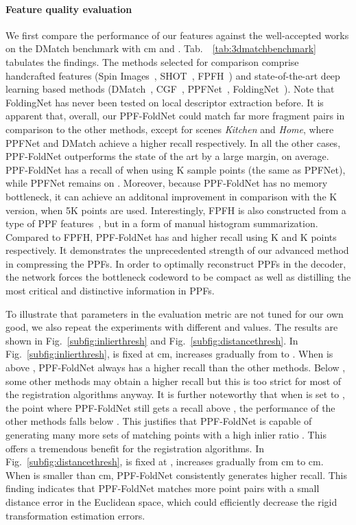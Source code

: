 \paragraph{Feature quality evaluation}
We first compare the performance of our features against the well-accepted works on the DMatch benchmark with  cm and . Tab.~~\ref{tab:3dmatchbenchmark} tabulates the findings. The methods selected for comparison comprise  handcrafted features (Spin Images~\cite{spin}, SHOT~\cite{shot}, FPFH~\cite{fpfh}) and  state-of-the-art deep learning based methods (DMatch~\cite{zeng20163dmatch}, CGF~\cite{Khoury_2017_ICCV}, PPFNet~\cite{ppfnet}, FoldingNet~\cite{foldingnet}). Note that FoldingNet has never been tested on local descriptor extraction before. It is apparent that, overall, our PPF-FoldNet could match far more fragment pairs in comparison to the other methods, except for scenes \textit{Kitchen} and \textit{Home}, where PPFNet and DMatch achieve a higher recall respectively. In all the other cases, PPF-FoldNet outperforms the state of the art by a large margin,  on average. PPF-FoldNet has a recall of  when using K sample points (the same as PPFNet), while PPFNet remains on . Moreover, because PPF-FoldNet has no memory bottleneck, it can achieve an additonal  improvement in comparison with the K version, when 5K points are used. Interestingly, FPFH is also constructed from a type of PPF features~\cite{fpfh}, but in a form of manual histogram summarization. Compared to FPFH, PPF-FoldNet has   and  higher recall using K and K points respectively. It demonstrates the unprecedented strength of our advanced method in compressing the PPFs. In order to optimally reconstruct PPFs in the decoder, the network forces the bottleneck codeword to be compact as well as distilling the most critical and distinctive information in PPFs. 

To illustrate that parameters in the evaluation metric are not tuned for our own good, we also repeat the experiments with different  and  values. The results are shown in Fig.~\ref{subfig:inlierthresh} and Fig.~\ref{subfig:distancethresh}. In Fig.~\ref{subfig:inlierthresh},  is fixed at  cm,  increases gradually from  to . When  is above , PPF-FoldNet always has a higher recall than the other methods. Below , some other methods may obtain a higher recall but this is too strict for most of the registration algorithms anyway. It is further noteworthy that when  is set to , the point where PPF-FoldNet still gets a recall above , the performance of the other methods falls below . This justifies that PPF-FoldNet is capable of generating many more sets of matching points with a high inlier ratio . This offers a tremendous benefit for the registration algorithms. In Fig.~\ref{subfig:distancethresh},  is fixed at ,  increases gradually from  cm to  cm. When  is smaller than  cm, PPF-FoldNet consistently generates higher recall. This finding indicates that PPF-FoldNet matches more point pairs with a small distance error in the Euclidean space, which could efficiently decrease the rigid transformation estimation errors.

